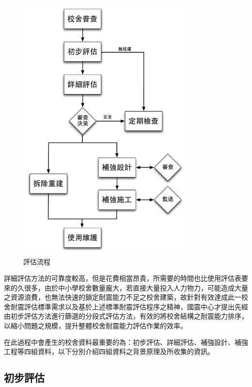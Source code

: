 \begin{figure}[hbtp]
  \begin{center}
    \includegraphics[width=0.8\textwidth]{figures/survey-flow.pdf}
    \caption{評估流程} 
    \label{fig:FLOW}
  \end{center}
\end{figure}

詳細評估方法的可靠度較高，但是花費相當昂貴，所需要的時間也比使用評估表要來的久很多，由於中小學校舍數量龐大，若直接大量投入人力物力，可能造成大量之資源浪費，也無法快速的鎖定耐震能力不足之校舍建築，故針對有效達成此一校舍耐震評估標準需求以及基於上述標準耐震評估程序之精神，國震中心才提出先經由初步評估方法進行篩選的分段式評估方法，有效的將校舍結構之耐震能力排序，以縮小問題之規模，提升整體校舍耐震能力評估作業的效率。

在此過程中會產生的校舍資料最重要的為：初步評估、詳細評估、補強設計、補強工程等四組資料，以下分別介紹四組資料之背景原理及所收集的資訊。

\subsection{初步評估}

